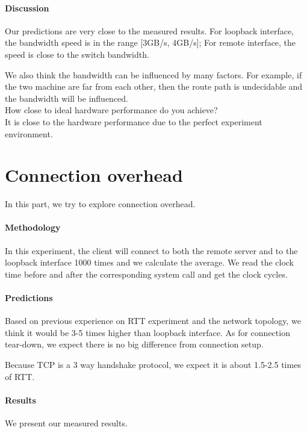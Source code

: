 \paragraph{Discussion}
Our predictions are very close to the measured results. For loopback interface, the bandwidth speed is in the range [3GB/s, 4GB/s]; For remote interface, the speed is close to the switch bandwidth.

We also think the bandwidth can be influenced by many factors. For example, if the two machine are far from each other, then the route path is undecidable and the bandwidth will be influenced. \\

How close to ideal hardware performance do you achieve? \\
It is close to the hardware performance due to the perfect experiment environment.

\section{Connection overhead}
In this part, we try to explore connection overhead.

\paragraph{Methodology}
In this experiment, the client will connect to both the remote server and to the loopback interface 1000 times and we calculate the average.
We read the clock time before and after the corresponding system call and get the clock cycles.

\paragraph{Predictions}

Based on previous experience on RTT experiment and the network topology, we think  it would be 3-5 times higher than loopback interface. As for connection tear-down, we expect there is no big difference from connection setup.

Because TCP is a 3 way handshake protocol, we expect it is about 1.5-2.5 times of RTT.

\paragraph{Results}
We present our measured results.

